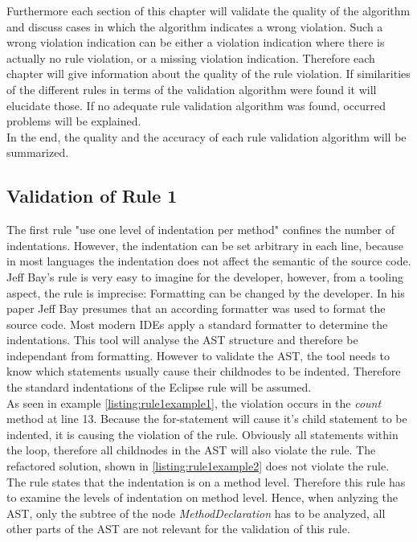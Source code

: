 Furthermore each section of this chapter will validate the quality of the algorithm and discuss cases in which the algorithm indicates a wrong violation. Such a wrong violation indication can be either a violation indication where there is actually no rule violation, or a missing violation indication. Therefore each chapter will give information about the quality of the rule violation. If similarities of the different rules in terms of the validation algorithm were found it will elucidate those. If no adequate rule validation algorithm was found, occurred problems will be explained.
\\

In the end, the quality and the accuracy of each rule validation algorithm will be summarized. 


\subsection*{Validation of Rule 1}
The first rule "use one level of indentation per method" confines the number of indentations. However, the indentation can be set arbitrary in each line, because in most languages the indentation does not affect the semantic of the source code. Jeff Bay's rule is very easy to imagine for the developer, however, from a tooling aspect, the rule is imprecise: Formatting can be changed by the developer. In his paper Jeff Bay presumes that an according formatter was used to format the source code. Most modern \acf{IDE}s apply a standard formatter to determine the indentations. This tool will analyse the \acf{AST} structure and therefore be independant from formatting. However to validate the \acf{AST}, the tool needs to know which statements usually cause their childnodes to be indented. Therefore the standard indentations of the Eclipse rule will be assumed.
\\

As seen in example \ref{listing:rule1example1}, the violation occurs in the \textit{count} method at line 13. Because the for-statement will cause it's child statement to be indented, it is causing the violation of the rule. Obviously all statements within the loop, therefore all childnodes in the \acf{AST} will also violate the rule. The refactored solution, shown in \ref{listing:rule1example2} does not violate the rule. 
\\

The rule states that the indentation is on a method level. Therefore this rule has to examine the levels of indentation on method level. Hence, when anlyzing the \acf{AST}, only the subtree of the node \textit{MethodDeclaration} has to be analyzed, all other parts of the \acf{AST} are not relevant for the validation of this rule.
\\

